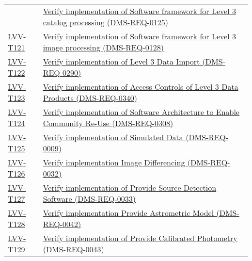 \begin{longtable}[]{p{3cm}p{13cm}}
&
\href{https://jira.lsstcorp.org/secure/Tests.jspa\#/testCase/LVV-T120}{Verify
implementation of Software framework for Level 3 catalog processing
(DMS-REQ-0125)}\tabularnewline
\protect\hyperlink{lvv-t121---verify-implementation-of-software-framework-for-level-3-image-processing-dms-req-0128}{LVV-T121}
&
\href{https://jira.lsstcorp.org/secure/Tests.jspa\#/testCase/LVV-T121}{Verify
implementation of Software framework for Level 3 image processing
(DMS-REQ-0128)}\tabularnewline
\protect\hyperlink{lvv-t122---verify-implementation-of-level-3-data-import-dms-req-0290}{LVV-T122}
&
\href{https://jira.lsstcorp.org/secure/Tests.jspa\#/testCase/LVV-T122}{Verify
implementation of Level 3 Data Import (DMS-REQ-0290)}\tabularnewline
\protect\hyperlink{lvv-t123---verify-implementation-of-access-controls-of-level-3-data-products-dms-req-0340}{LVV-T123}
&
\href{https://jira.lsstcorp.org/secure/Tests.jspa\#/testCase/LVV-T123}{Verify
implementation of Access Controls of Level 3 Data Products
(DMS-REQ-0340)}\tabularnewline
\protect\hyperlink{lvv-t124---verify-implementation-of--software-architecture-to-enable-community-re-use-dms-req-0308}{LVV-T124}
&
\href{https://jira.lsstcorp.org/secure/Tests.jspa\#/testCase/LVV-T124}{Verify
implementation of Software Architecture to Enable Community Re-Use
(DMS-REQ-0308)}\tabularnewline
\protect\hyperlink{lvv-t125---verify-implementation-of-simulated-data-dms-req-0009}{LVV-T125}
&
\href{https://jira.lsstcorp.org/secure/Tests.jspa\#/testCase/LVV-T125}{Verify
implementation of Simulated Data (DMS-REQ-0009)}\tabularnewline
\protect\hyperlink{lvv-t126---verify-implementation--image-differencing-dms-req-0032}{LVV-T126}
&
\href{https://jira.lsstcorp.org/secure/Tests.jspa\#/testCase/LVV-T126}{Verify
implementation Image Differencing (DMS-REQ-0032)}\tabularnewline
\protect\hyperlink{lvv-t127---verify-implementation-of-provide-source-detection-software-dms-req-0033}{LVV-T127}
&
\href{https://jira.lsstcorp.org/secure/Tests.jspa\#/testCase/LVV-T127}{Verify
implementation of Provide Source Detection Software
(DMS-REQ-0033)}\tabularnewline
\protect\hyperlink{lvv-t128---verify-implementation-provide-astrometric-model-dms-req-0042}{LVV-T128}
&
\href{https://jira.lsstcorp.org/secure/Tests.jspa\#/testCase/LVV-T128}{Verify
implementation Provide Astrometric Model (DMS-REQ-0042)}\tabularnewline
\protect\hyperlink{lvv-t129---verify-implementation-of-provide-calibrated-photometry-dms-req-0043}{LVV-T129}
&
\href{https://jira.lsstcorp.org/secure/Tests.jspa\#/testCase/LVV-T129}{Verify
implementation of Provide Calibrated Photometry
(DMS-REQ-0043)}\tabularnewline

\end{longtable}
